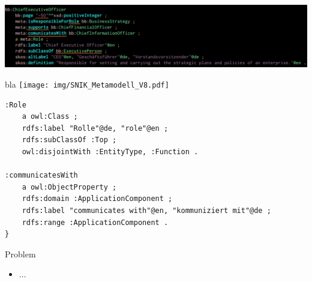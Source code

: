 \documentclass[14pt,aspectratio=1610]{beamer}
\begin{document}
\begin{frame}{}
\centering\includegraphics[width=1.05\textwidth,height=1.05\textheight,keepaspectratio]{img/bb-ceo-marked.png}
\end{frame}

\begin{frame}{bla}
\centering\texttt{[image: img/SNIK\_Metamodell\_V8.pdf]}
\end{frame}

\begin{frame}[fragile]{}
\begin{verbatim}
:Role
    a owl:Class ;
    rdfs:label "Rolle"@de, "role"@en ;  
    rdfs:subClassOf :Top ;
    owl:disjointWith :EntityType, :Function .

:communicatesWith
    a owl:ObjectProperty ; 
    rdfs:domain :ApplicationComponent ;
    rdfs:label "communicates with"@en, "kommuniziert mit"@de ;
    rdfs:range :ApplicationComponent .
}
\end{verbatim}
\end{frame}

\begin{frame}{Problem}
\begin{itemize}
\item $\ldots$
\end{itemize}
\end{frame}
\end{document}
